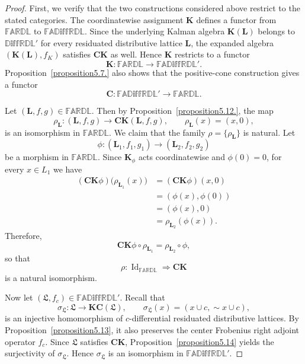 \documentclass[final,12pt,times]{elsarticle}
\theoremstyle{plain}
\theoremstyle{definition}
\theoremstyle{break}
\begin{document}
\begin{proof}
First, we verify that the two constructions considered above restrict to the stated categories. The coordinatewise assignment $\mathbf{K}$ defines a functor from $\mathbb{FARDL}$ to $\mathbb{FAD\text{iff}RDL}$. Since the underlying Kalman algebra $\mathbf{K}(\mathbf{L})$ belongs to $\mathbb{D\text{iff}RDL'}$ for every residuated distributive lattice $\mathbf{L}$, the expanded algebra $(\mathbf{K}(\mathbf{L}),f_K)$ satisfies $\mathbf{CK}$ as well. Hence $\mathbf{K}$ restricts to a functor
\[
\mathbf{K}:\mathbb{FARDL}\longrightarrow\mathbb{FAD\text{iff}RDL'}.
\]
Proposition~\ref{proposition5.7.} also shows that the positive-cone construction gives a functor
\[
\mathbf{C}:\mathbb{FAD\text{iff}RDL'}\longrightarrow\mathbb{FARDL}.
\]

Let $(\mathbf{L},f,g)\in\mathbb{FARDL}$. Then by Proposition~\ref{proposition5.12.}, the map
\[
\rho_{\mathbf{L}}:(\mathbf{L},f,g)
   \longrightarrow \mathbf{C}\mathbf{K}(\mathbf{L},f,g),
\qquad
\rho_{\mathbf{L}}(x)=(x,0),
\]
is an isomorphism in $\mathbb{FARDL}$. We claim that the family
$\rho=\{\rho_{\mathbf{L}}\}$ is natural. Let
\[
\phi:(\mathbf{L}_1,f_1,g_1)\longrightarrow(\mathbf{L}_2,f_2,g_2)
\]
be a morphism in $\mathbb{FARDL}$. Since $\mathbf{K}_{\phi}$ acts coordinatewise and $\phi(0)=0$, for every $x\in L_1$ we have
\[
\begin{aligned}
(\mathbf{C}\mathbf{K}\phi)\bigl(\rho_{\mathbf{L}_1}(x)\bigr)
  &=(\mathbf{C}\mathbf{K}\phi)(x,0)\\
  &=(\phi(x),\phi(0))\\
  &=(\phi(x),0)\\
  &=\rho_{\mathbf{L}_2}(\phi(x)).
\end{aligned}
\]
Therefore,
\[
\mathbf{C}\mathbf{K}\phi\circ\rho_{\mathbf{L}_1}
   =\rho_{\mathbf{L}_2}\circ\phi,
\]
so that
\[
\rho:\operatorname{Id}_{\mathbb{FARDL}}
   \Longrightarrow\mathbf{C}\mathbf{K}
\]
is a natural isomorphism.

Now let $(\boldsymbol{\mathfrak{L}},f_c)\in\mathbb{FAD\text{iff}RDL'}$. Recall that
\[
\sigma_{\boldsymbol{\mathfrak{L}}}:\boldsymbol{\mathfrak{L}}
   \longrightarrow\mathbf{K}\mathbf{C}(\boldsymbol{\mathfrak{L}}),
\qquad
\sigma_{\boldsymbol{\mathfrak{L}}}(x)
   =(x\cup c,\sim x\cup c),
\]
is an injective homomorphism of $c$-differential residuated distributive lattices. By Proposition~\ref{proposition5.13}, it also preserves the center Frobenius right adjoint operator $f_c$. Since $\boldsymbol{\mathfrak{L}}$ satisfies $\mathbf{CK}$, Proposition~\ref{proposition5.14} yields the surjectivity of $\sigma_{\boldsymbol{\mathfrak{L}}}$. Hence $\sigma_{\boldsymbol{\mathfrak{L}}}$ is an isomorphism in $\mathbb{FAD\text{iff}RDL'}$.


\end{proof}
\end{document}
